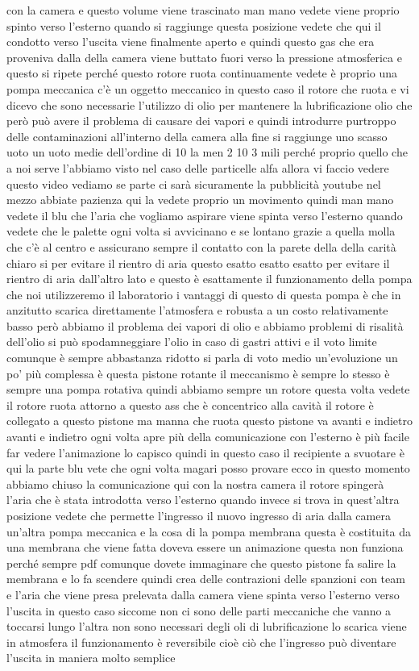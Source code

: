 con la camera e questo volume viene trascinato man mano vedete viene proprio spinto verso l'esterno quando si raggiunge questa posizione vedete che qui il condotto verso l'uscita viene finalmente aperto e quindi questo gas che era proveniva dalla della camera viene buttato fuori verso la pressione atmosferica e questo si ripete perché questo rotore ruota continuamente vedete è proprio una pompa meccanica c'è un oggetto meccanico in questo caso il rotore che ruota e vi dicevo che sono necessarie l'utilizzo di olio per mantenere la lubrificazione olio che però può avere il problema di causare dei vapori e quindi introdurre purtroppo delle contaminazioni all'interno della camera alla fine si raggiunge uno scasso uoto un uoto medie dell'ordine di 10 la men 2 10 3 mili perché proprio quello che a noi serve l'abbiamo visto nel caso delle particelle alfa allora vi faccio vedere questo video vediamo se parte ci sarà sicuramente la pubblicità youtube nel mezzo abbiate pazienza qui la vedete proprio un movimento quindi man mano vedete il blu che l'aria che vogliamo aspirare viene spinta verso l'esterno quando vedete che le palette ogni volta si avvicinano e se lontano grazie a quella molla che c'è al centro e assicurano sempre il contatto con la parete della della carità chiaro si per evitare il rientro di aria questo esatto esatto esatto per evitare il rientro di aria dall'altro lato e questo è esattamente il funzionamento della pompa che noi utilizzeremo il laboratorio i vantaggi di questo di questa pompa è che in anzitutto scarica direttamente l'atmosfera e robusta a un costo relativamente basso però abbiamo il problema dei vapori di olio e abbiamo problemi di risalità dell'olio si può spodamneggiare l'olio in caso di gastri attivi e il voto limite comunque è sempre abbastanza ridotto si parla di voto medio un'evoluzione un po' più complessa è questa pistone rotante il meccanismo è sempre lo stesso è sempre una pompa rotativa quindi abbiamo sempre un rotore questa volta vedete il rotore ruota attorno a questo ass che è concentrico alla cavità il rotore è collegato a questo pistone ma manna che ruota questo pistone va avanti e indietro avanti e indietro ogni volta apre più della comunicazione con l'esterno è più facile far vedere l'animazione lo capisco quindi in questo caso il recipiente a svuotare è qui la parte blu vete che ogni volta magari posso provare ecco in questo momento abbiamo chiuso la comunicazione qui con la nostra camera il rotore spingerà l'aria che è stata introdotta verso l'esterno quando invece si trova in quest'altra posizione vedete che permette l'ingresso il nuovo ingresso di aria dalla camera un'altra pompa meccanica e la cosa di la pompa membrana questa è costituita da una membrana che viene fatta doveva essere un animazione questa non funziona perché sempre pdf comunque dovete immaginare che questo pistone fa salire la membrana e lo fa scendere quindi crea delle contrazioni delle spanzioni con team e l'aria che viene presa prelevata dalla camera viene spinta verso l'esterno verso l'uscita in questo caso siccome non ci sono delle parti meccaniche che vanno a toccarsi lungo l'altra non sono necessari degli oli di lubrificazione lo scarica viene in atmosfera il funzionamento è reversibile cioè ciò che l'ingresso può diventare l'uscita in maniera molto semplice 